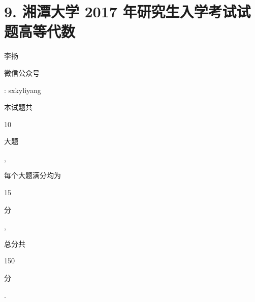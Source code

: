 \documentclass[10pt]{article}
\begin{document}
\section{9. 湘潭大学 2017 年研究生入学考试试题高等代数}
\begin{CJK}{UTF8}{mj}李扬\end{CJK}

\begin{CJK}{UTF8}{mj}微信公众号\end{CJK}: sxkyliyang

\begin{CJK}{UTF8}{mj}本试题共\end{CJK} 10 \begin{CJK}{UTF8}{mj}大题\end{CJK}, \begin{CJK}{UTF8}{mj}每个大题满分均为\end{CJK} 15 \begin{CJK}{UTF8}{mj}分\end{CJK}, \begin{CJK}{UTF8}{mj}总分共\end{CJK} 150 \begin{CJK}{UTF8}{mj}分\end{CJK}.
\end{document}
